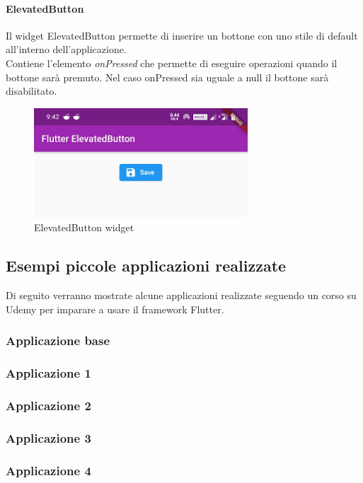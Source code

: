 \paragraph{ElevatedButton}
Il widget ElevatedButton permette di inserire un bottone con uno stile di default all'interno dell'applicazione.\\
Contiene l'elemento \textit{onPressed} che permette di eseguire operazioni quando il bottone sarà premuto. Nel caso onPressed sia uguale a null il bottone sarà disabilitato.
\begin{figure}[htbp]	
	\centering
	\includegraphics[width=8cm]{immagini/button.png}
	\caption{ElevatedButton widget}
	\label{fig:ElevatedButton widget}
\end{figure}

\newpage

\subsection{Esempi piccole applicazioni realizzate}
Di seguito verranno mostrate alcune applicazioni realizzate seguendo un corso su Udemy per imparare a usare il framework Flutter.

\subsubsection{Applicazione base}

\subsubsection{Applicazione 1}

\subsubsection{Applicazione 2}

\subsubsection{Applicazione 3}

\subsubsection{Applicazione 4}




